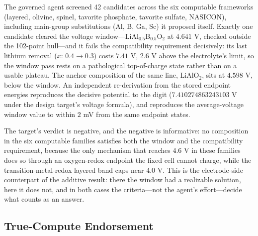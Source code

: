The governed agent screened 42 candidates across the six computable frameworks
(layered, olivine, spinel, tavorite phosphate, tavorite sulfate, NASICON),
including main-group substitutions (Al, B, Ga, Sc) it proposed itself. Exactly one
candidate cleared the voltage window---LiAl$_{0.5}$B$_{0.5}$O$_2$ at $4.641$ V,
checked outside the 102-point hull---and it fails the compatibility
requirement decisively: its last lithium removal ($x$: $0.4 \rightarrow 0.3$)
costs $7.41$ V, 2.6 V above the electrolyte's limit, so the window pass rests on a
pathological top-of-charge state rather than on a usable plateau. The anchor
composition of the same line, LiAlO$_2$, sits at $4.598$ V, below the window. An
independent re-derivation from the stored endpoint energies reproduces the
decisive potential to the digit ($7.410274863243103$ V under the design target's
voltage formula), and reproduces the average-voltage window value to within
$2$ mV from the same endpoint states.

The target's verdict is negative, and the negative is informative: no
composition in the six computable families satisfies both the window and the
compatibility requirement, because the only mechanism that reaches $4.6$ V in
these families does so through an oxygen-redox endpoint the fixed cell cannot
charge, while the transition-metal-redox layered band caps near $4.0$ V. This is
the electrode-side counterpart of the additive result: there the window had a
realizable solution, here it does not, and in both cases the criteria---not the
agent's effort---decide what counts as an answer.

\subsection{True-Compute Endorsement}
\label{sec:endorse}

